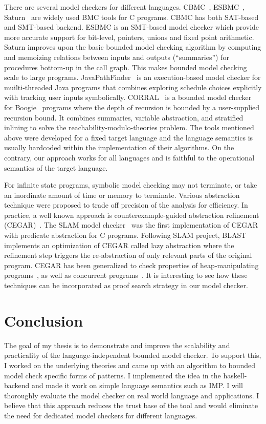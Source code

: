 \documentclass{almostllncs}
\begin{document}
There are several model checkers for different languages.
CBMC~\cite{Clarke2004ATF}, ESBMC~\cite{ESBMC},  Saturn~\cite{DBLP:conf/popl/XieA05} are widely used BMC tools for C programs.
CBMC has both SAT-based and SMT-based backend.
ESBMC is an SMT-based model checker which provide more accurate support for bit-level, pointers, unions and fixed point arithmetic.
Saturn improves upon the basic bounded model checking algorithm by computing and memoizing relations between inputs and outputs (“summaries”) for procedures bottom-up in the call graph.
This makes bounded model checking scale to large programs.
JavaPathFinder~\cite{Havelund2000} is an execution-based model checker for muilti-threaded Java programs that combines exploring schedule choices explicitly with tracking user inputs symbolically.
CORRAL~\cite{corral-a-solver-for-reachability-modulo-theories-2} is a bounded model checker for Boogie~\cite{boogie} programs where the depth of recursion is bounded by a user-supplied recursion bound.
It combines summaries, variable abstraction, and stratified inlining to solve the
reachability-modulo-theories problem.
The tools mentioned above were developed for a fixed target language and the language semantics is usually hardcoded within the implementation of their algorithms.
On the contrary, our approach works for all languages and is faithful to the operational semantics of the target language.

For infinite state programs, symbolic model checking may not terminate, or take
an inordinate amount of time or memory to terminate.
Various abstraction technique were proposed to trade off precision of the analysis for efficiency.
In practice, a well known approach is counterexample-guided abstraction refinement (CEGAR)~\cite{CEGR}.
The SLAM model checker~\cite{SLAM} was the first implementation of CEGAR with predicate abstraction for C programs.
Following SLAM project, BLAST~\cite{Henzinger:2002:LA:503272.503279} implements an optimization of CEGAR called lazy abstraction where the refinement step triggers the re-abstraction of only relevant parts of the original program.
CEGAR has been generalized to check properties of heap-manipulating programs~\cite{10.1007/978-3-642-12029-9_19}, as well as concurrent programs~\cite{Chaki:2003:MVS:776816.776863}.
It is interesting to see how these techniques can be incorporated as proof search strategy in our model checker.

\section{Conclusion}
The goal of my thesis is to demonstrate and improve the scalability and
practicality of the language-independent bounded model checker.
To support this, I worked on the underlying theories and came up with an algorithm to bounded model check specific forms of \modmul patterns.
I implemented the idea in the \K haskell-backend and made it work on simple language semantics such as IMP.
I will thoroughly evaluate the model checker on real world language and applications.
I believe that this approach reduces the trust base of the tool and would eliminate the need for dedicated model checkers for different languages.




\end{document}

